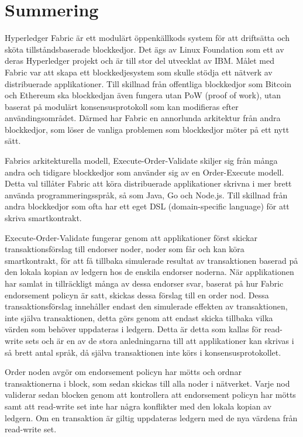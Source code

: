 \section{Summering}

Hyperledger Fabric är ett modulärt öppenkällkods system för att driftsätta och sköta tillståndsbaserade blockkedjor. Det ägs av Linux Foundation som ett av deras Hyperledger projekt och är till stor del utvecklat av IBM. Målet med Fabric var att skapa ett blockkedjesystem som skulle stödja ett nätverk av distribuerade applikationer. Till skillnad från offentliga blockkedjor som Bitcoin och Ethereum ska blockkedjan även fungera utan PoW (proof of work), utan baserat på modulärt konsensusprotokoll som kan modifieras efter användingsområdet. Därmed har Fabric en annorlunda arkitektur från andra blockkedjor, som löser de vanliga problemen som blockkedjor möter på ett nytt sätt.



Fabrics arkitekturella modell, Execute-Order-Validate skiljer sig från många andra och tidigare blockkedjor som använder sig av en Order-Execute modell. Detta val tillåter Fabric att köra distribuerade applikationer skrivna i mer brett använda programmeringsspråk, så som Java, Go och Node.js. Till skillnad från andra blockkedjor som ofta har ett eget DSL (domain-specific language) för att skriva smartkontrakt.

Execute-Order-Validate fungerar genom att applikationer först skickar transaktionsförslag till endorser noder, noder som får och kan köra smartkontrakt, för att få tillbaka simulerade resultat av transaktionen baserad på den lokala kopian av ledgern hos de enskila endorser noderna. När applikationen har samlat in tillräckligt många av dessa endorser svar, baserat på hur Fabric endorsement policyn är satt, skickas dessa förslag till en order nod. Dessa transaktionsförslag innehåller endast den simulerade effekten av transaktionen, inte själva transaktionen, detta görs genom att endast skicka tillbaka vilka värden som behöver uppdateras i ledgern. Detta är detta som kallas för read-write sets och är en av de stora anledningarna till att applikationer kan skrivas i så brett antal språk, då själva transaktionen inte körs i konsensusprotokollet.

Order noden avgör om endorsement policyn har mötts och ordnar transaktionerna i block, som sedan skickas till alla noder i nätverket. Varje nod validerar sedan blocken genom att kontrollera att endorsement policyn har mötts samt att read-write set inte har några konflikter med den lokala kopian av ledgern. Om en transaktion är giltig uppdateras ledgern med de nya värdena från read-write set.



